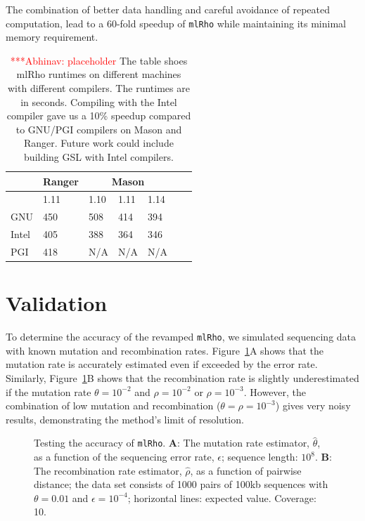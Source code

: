 \documentclass{sig-alternate}
\newcommand{\abhi}[1]{ {\textcolor{red} { ***Abhinav: #1 }}}
\newcommand{\abhi}[1]{ {}}
\newcommand{\ty}{\texttt}
\begin{document}
The combination of better data handling and careful avoidance of
repeated computation, lead to a 60-fold speedup of \ty{mlRho} while
maintaining its minimal memory requirement.
\begin{table}
\centering
\begin{tabular}{| l  | l  | l  | l  | l  | l  | l  |} \hline
	&Ranger & \multicolumn{3}{|c|}{Mason}\\ \hline
	& 1.11  & 1.10&1.11 & 1.14\\ \hline
GNU & 450 & 508 & 414 & 394   \\
\hline
Intel & 405 & 388 & 364 & 346\\
\hline
PGI &418 & N/A   & N/A &N/A\\
\hline

\end{tabular}
\caption{\abhi{placeholder}The table shoes mlRho runtimes on different machines with different compilers. The runtimes are in seconds. Compiling with the Intel compiler gave us a 10\% speedup compared to GNU/PGI compilers on Mason and Ranger. Future work could include building GSL with Intel compilers.   } 
\label{table:cache_comp}
\end{table}

\section{Validation}
To determine the accuracy of the revamped \ty{mlRho}, we simulated
sequencing data with known mutation and recombination
rates. Figure~\ref{fig:test}A shows that the mutation rate is
accurately estimated even if exceeded by the error
rate. Similarly, Figure~\ref{fig:test}B shows that the recombination rate is
slightly underestimated if the mutation rate $\theta=10^{-2}$ and
$\rho=10^{-2}$ or $\rho=10^{-3}$. However, the combination of low
mutation and recombination ($\theta=\rho=10^{-3}$) gives very noisy
results, demonstrating the method's limit of resolution.

\begin{figure}
  \begin{center}
  \end{center}
\caption{Testing the accuracy of \ty{mlRho}. \textbf{A}: The mutation
  rate estimator, $\hat\theta$, as a function of the sequencing error
  rate, $\epsilon$; sequence length: $10^8$. \textbf{B}: The
  recombination rate estimator, $\hat\rho$, as a function of pairwise
  distance; the data set consists of 1000 pairs of 100kb sequences
  with $\theta=0.01$ and $\epsilon=10^{-4}$; horizontal lines:
  expected value. Coverage: 10.}\label{fig:test}
\end{figure}
\end{document}
